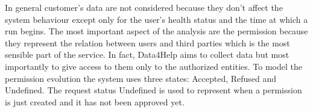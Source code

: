 \documentclass[a4paper]{article}
\begin{document}
In general customer's data are not considered because they don't affect the system behaviour except only for the user's health status and the time at which a run begins. \newline The most important aspect of the analysis are the permission because they represent the relation between users and third parties which is the most sensible part of the service. \newline In fact, Data4Help aims to collect data but most importantly to give access to them only to the authorized entities. \newline
To model the permission evolution the system uses three states: Accepted, Refused and Undefined. \newline
The request status Undefined is used to represent when a permission is just created and it has not been approved yet.

\clearpage
\end{document}
